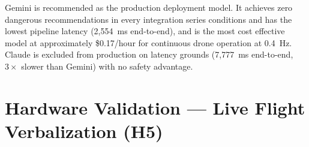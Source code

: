 Gemini is recommended as the production deployment model.
It achieves zero dangerous recommendations in every integration series conditions and has the lowest pipeline latency (2,554~ms end-to-end), and is the most cost effective model at approximately \$0.17/hour for continuous drone operation at 0.4~Hz. 
Claude is excluded from production on latency grounds (7,777~ms end-to-end, $3\times$ slower than Gemini) with no safety advantage.


\section{Hardware Validation --- Live Flight Verbalization (H5)}
\label{sec:ch2_h5}

%
%
%
%

